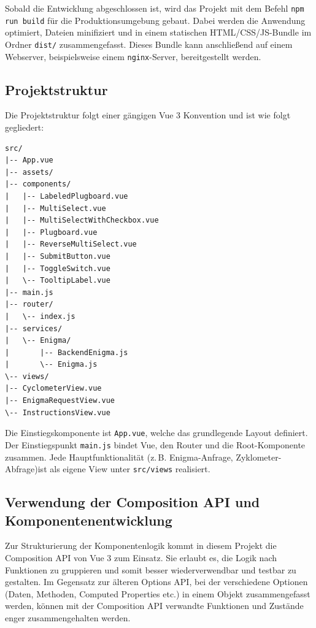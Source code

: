 \documentclass[12pt, ngerman, a4paper, numbers=noenddot]{article}
\begin{document}
Sobald die Entwicklung abgeschlossen ist, wird das Projekt mit dem Befehl \lstinline|npm run build| für die Produktionsumgebung gebaut. Dabei werden die Anwendung optimiert, Dateien minifiziert und in einem statischen HTML/CSS/JS-Bundle im Ordner \lstinline|dist/| zusammengefasst. Dieses Bundle kann anschließend auf einem Webserver, beispielsweise einem \lstinline|nginx|-Server, bereitgestellt werden.

\newpage
\subsection{Projektstruktur}

Die Projektstruktur folgt einer gängigen Vue 3 Konvention und ist wie folgt gegliedert:

\begin{lstlisting}[language=folderstructure, caption=Projektstruktur]
src/
|-- App.vue
|-- assets/
|-- components/
|   |-- LabeledPlugboard.vue
|   |-- MultiSelect.vue
|   |-- MultiSelectWithCheckbox.vue
|   |-- Plugboard.vue
|   |-- ReverseMultiSelect.vue
|   |-- SubmitButton.vue
|   |-- ToggleSwitch.vue
|   \-- TooltipLabel.vue
|-- main.js
|-- router/
|   \-- index.js
|-- services/
|   \-- Enigma/
|       |-- BackendEnigma.js
|       \-- Enigma.js
\-- views/
|-- CyclometerView.vue
|-- EnigmaRequestView.vue
\-- InstructionsView.vue
\end{lstlisting}


Die Einstiegskomponente ist \lstinline|App.vue|, welche das grundlegende Layout definiert. Der Einstiegspunkt \lstinline|main.js| bindet Vue, den Router und die Root-Komponente zusammen. Jede Hauptfunktionalität (z.\,B. Enigma-Anfrage,  Zyklometer-Abfrage)\newline ist als eigene View unter \lstinline|src/views| realisiert.

\subsection{Verwendung der Composition API und Komponentenentwicklung}

Zur Strukturierung der Komponentenlogik kommt in diesem Projekt die Composition API von Vue 3 zum Einsatz. Sie erlaubt es, die Logik nach Funktionen zu gruppieren und somit besser wiederverwendbar und testbar zu gestalten. Im Gegensatz zur älteren Options API, bei der verschiedene Optionen (Daten, Methoden, Computed Properties etc.) in einem Objekt zusammengefasst werden, können mit der Composition API verwandte Funktionen und Zustände enger zusammengehalten werden.
\end{document}
